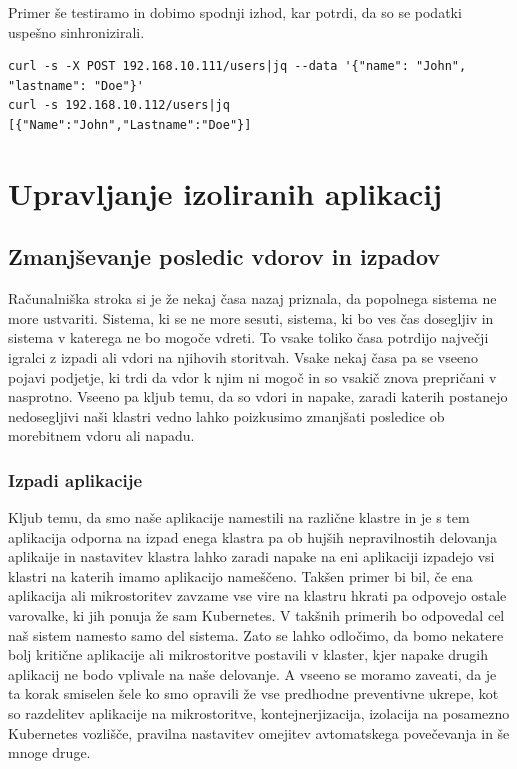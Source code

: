 \documentclass[a4paper, 12pt]{book}
\begin{document}
Primer še testiramo in dobimo spodnji izhod, kar potrdi, da so se podatki uspešno sinhronizirali.
\begin{verbatim}
curl -s -X POST 192.168.10.111/users|jq --data '{"name": "John", "lastname": "Doe"}'
curl -s 192.168.10.112/users|jq
[{"Name":"John","Lastname":"Doe"}]
\end{verbatim}



\chapter{Upravljanje izoliranih aplikacij}
\section{Zmanjševanje posledic vdorov in izpadov}
Računalniška stroka si je že nekaj časa nazaj priznala, da popolnega sistema ne more ustvariti.
Sistema, ki se ne more sesuti, sistema, ki bo ves čas dosegljiv in sistema v katerega ne bo mogoče vdreti.
To vsake toliko časa potrdijo največji igralci z izpadi ali vdori na njihovih storitvah. 
Vsake nekaj časa pa se vseeno pojavi podjetje, ki trdi da vdor k njim ni mogoč in so vsakič znova prepričani v nasprotno.
Vseeno pa kljub temu, da so vdori in napake, zaradi katerih postanejo nedosegljivi naši klastri vedno lahko poizkusimo zmanjšati posledice ob morebitnem vdoru ali napadu. 
\subsection{Izpadi aplikacije}
Kljub temu, da smo naše aplikacije namestili na različne klastre in je s tem aplikacija odporna na izpad enega klastra pa ob hujših nepravilnostih delovanja aplikaije in nastavitev klastra lahko zaradi napake na eni aplikaciji izpadejo vsi klastri na katerih imamo aplikacijo nameščeno.
Takšen primer bi bil, če ena aplikacija ali mikrostoritev zavzame vse vire na klastru hkrati pa odpovejo ostale varovalke, ki jih ponuja že sam Kubernetes.
V takšnih primerih bo odpovedal cel naš sistem namesto samo del sistema.
Zato se lahko odločimo, da bomo nekatere bolj kritične aplikacije ali mikrostoritve postavili v klaster, kjer napake drugih aplikacij ne bodo vplivale na naše delovanje.
A vseeno se moramo zaveati, da je ta korak smiselen šele ko smo opravili že vse predhodne preventivne ukrepe, kot so razdelitev aplikacije na mikrostoritve, kontejnerjizacija, izolacija na posamezno Kubernetes vozlišče, pravilna nastavitev omejitev avtomatskega povečevanja in še mnoge druge.
\end{document}
